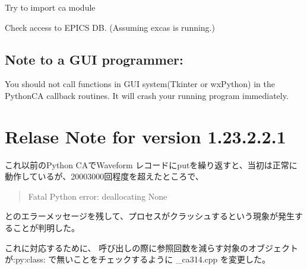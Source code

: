 \documentclass[a4paper,12pt,dvipdfmx]{sphinxhowto}
\begin{document}
\sphinxAtStartPar
Try to import ca module

\begin{sphinxVerbatim}[commandchars=\\\{\}]
 
\end{sphinxVerbatim}

\sphinxAtStartPar
Check access to EPICS DB. (Assuming excas is running.)

\begin{sphinxVerbatim}[commandchars=\\\{\}]
\end{sphinxVerbatim}


\subsection{Note to a GUI programmer:}
\label{\detokenize{InstallationMemo:note-to-a-gui-programmer}}
\begin{DUlineblock}{0em}
\item[] You should not call functions in GUI system(Tkinter or wxPython) in
the Python\sphinxhyphen{}CA callback routines. It will crash your running program
immediately.
\end{DUlineblock}

\sphinxstepscope


\section{Relase Note for version 1.23.2.2.1}
\label{\detokenize{ReleaseMemo-1.23.2.2.1:relase-note-for-version-1-23-2-2-1}}\label{\detokenize{ReleaseMemo-1.23.2.2.1::doc}}
\sphinxAtStartPar
これ以前のPython CAでWaveform レコードにputを繰り返すと、当初は正常に
動作しているが、2000\sphinxhyphen{}3000回程度を超えたところで、
\begin{quote}

\sphinxAtStartPar
Fatal Python error: deallocating None
\end{quote}

\sphinxAtStartPar
とのエラーメッセージを残して、プロセスがクラッシュするという現象が発生することが判明した。

\sphinxAtStartPar
これに対応するために、 呼び出しの際に参照回数を減らす対象のオブジェクト
が:py:class: で無いことをチェックするように \_ca314.cpp を変更した。
\end{document}

